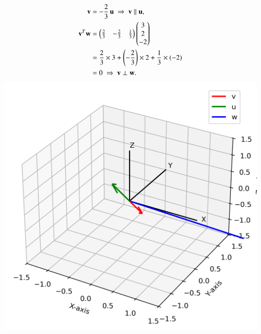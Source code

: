 \documentclass[journal]{IEEEtran}
\begin{document}
\begin{align*}
\mathbf v &= -\frac{2}{3}\,\mathbf u \;\Rightarrow\; \mathbf v \parallel \mathbf u, \\
\mathbf v^T \mathbf w &= \begin{pmatrix}\frac{2}{3}& -\frac{2}{3}& \frac{1}{3}\end{pmatrix}
\begin{pmatrix}3\\ 2\\ -2\end{pmatrix} \\
&= \frac{2}{3}\times 3 + \left(-\frac{2}{3}\right)\times 2 + \frac{1}{3}\times(-2) \\
&= 0 \;\Rightarrow\; \mathbf v \perp \mathbf w.
\end{align*}
\centering
    \includegraphics[width=\columnwidth, height=0.8\textheight, keepaspectratio]{figs/Figure_1.png}
\end{document}
